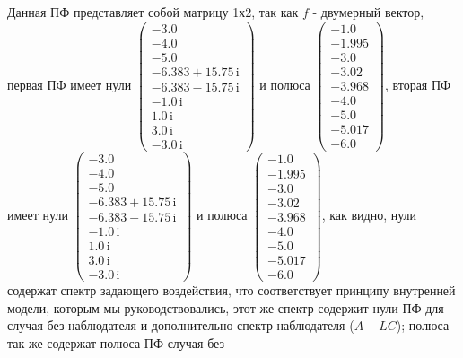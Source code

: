Данная ПФ представляет собой матрицу 1х2, так как $f$ - двумерный вектор, 
первая ПФ имеет нули $\left(\begin{array}{c}
-3.0\\
-4.0\\
-5.0\\
-6.383+15.75\,\mathrm{i}\\
-6.383-15.75\,\mathrm{i}\\
-1.0\,\mathrm{i}\\
1.0\,\mathrm{i}\\
3.0\,\mathrm{i}\\
-3.0\,\mathrm{i}
\end{array}\right)$ и полюса $\left(\begin{array}{c}
-1.0\\
-1.995\\
-3.0\\
-3.02\\
-3.968\\
-4.0\\
-5.0\\
-5.017\\
-6.0
\end{array}\right)$,
вторая ПФ имеет нули $\left(\begin{array}{c}
-3.0\\
-4.0\\
-5.0\\
-6.383+15.75\,\mathrm{i}\\
-6.383-15.75\,\mathrm{i}\\
-1.0\,\mathrm{i}\\
1.0\,\mathrm{i}\\
3.0\,\mathrm{i}\\
-3.0\,\mathrm{i}
\end{array}\right)$ и полюса $\left(\begin{array}{c}
-1.0\\
-1.995\\
-3.0\\
-3.02\\
-3.968\\
-4.0\\
-5.0\\
-5.017\\
-6.0
\end{array}\right)$,
как видно, нули содержат спектр задающего воздействия, что 
соответствует принципу внутренней модели, которым мы руководствовались, этот же спектр 
содержит нули ПФ для случая без наблюдателя и 
дополнительно спектр наблюдателя ($A+LC$); полюса так же содержат полюса ПФ случая без
